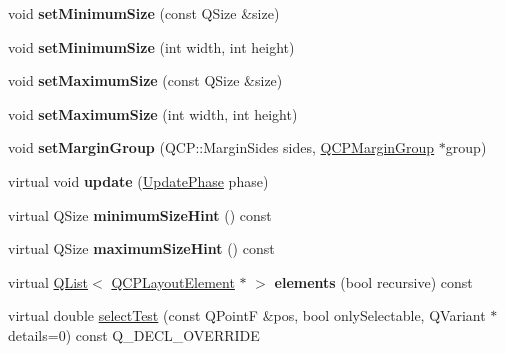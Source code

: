 \begin{DoxyCompactItemize}
\item 
void {\bfseries set\+Minimum\+Size} (const Q\+Size \&size)\hypertarget{class_q_c_p_layout_element_a5dd29a3c8bc88440c97c06b67be7886b}{}\label{class_q_c_p_layout_element_a5dd29a3c8bc88440c97c06b67be7886b}

\item 
void {\bfseries set\+Minimum\+Size} (int width, int height)\hypertarget{class_q_c_p_layout_element_a8e0447614a0bf92de9a7304588c6b96e}{}\label{class_q_c_p_layout_element_a8e0447614a0bf92de9a7304588c6b96e}

\item 
void {\bfseries set\+Maximum\+Size} (const Q\+Size \&size)\hypertarget{class_q_c_p_layout_element_a74eb5280a737ab44833d506db65efd95}{}\label{class_q_c_p_layout_element_a74eb5280a737ab44833d506db65efd95}

\item 
void {\bfseries set\+Maximum\+Size} (int width, int height)\hypertarget{class_q_c_p_layout_element_a03e0e9c48f230217c529b0819f832d84}{}\label{class_q_c_p_layout_element_a03e0e9c48f230217c529b0819f832d84}

\item 
void {\bfseries set\+Margin\+Group} (Q\+C\+P\+::\+Margin\+Sides sides, \hyperlink{class_q_c_p_margin_group}{Q\+C\+P\+Margin\+Group} $\ast$group)\hypertarget{class_q_c_p_layout_element_a516e56f76b6bc100e8e71d329866847d}{}\label{class_q_c_p_layout_element_a516e56f76b6bc100e8e71d329866847d}

\item 
virtual void {\bfseries update} (\hyperlink{class_q_c_p_layout_element_a0d83360e05735735aaf6d7983c56374d}{Update\+Phase} phase)\hypertarget{class_q_c_p_layout_element_ad6884e89825dbe06f198f659120799e6}{}\label{class_q_c_p_layout_element_ad6884e89825dbe06f198f659120799e6}

\item 
virtual Q\+Size {\bfseries minimum\+Size\+Hint} () const \hypertarget{class_q_c_p_layout_element_a011b52633e4bf631b2061dae4aee73dd}{}\label{class_q_c_p_layout_element_a011b52633e4bf631b2061dae4aee73dd}

\item 
virtual Q\+Size {\bfseries maximum\+Size\+Hint} () const \hypertarget{class_q_c_p_layout_element_adb2e949deaf27d9f2c6a6717d29ded2b}{}\label{class_q_c_p_layout_element_adb2e949deaf27d9f2c6a6717d29ded2b}

\item 
virtual \hyperlink{class_q_list}{Q\+List}$<$ \hyperlink{class_q_c_p_layout_element}{Q\+C\+P\+Layout\+Element} $\ast$ $>$ {\bfseries elements} (bool recursive) const \hypertarget{class_q_c_p_layout_element_af9e2f92be3efce79b6a0ceeabd89e030}{}\label{class_q_c_p_layout_element_af9e2f92be3efce79b6a0ceeabd89e030}

\item 
virtual double \hyperlink{class_q_c_p_layout_element_a9e264e2033d3c136707792cd77932783}{select\+Test} (const Q\+PointF \&pos, bool only\+Selectable, Q\+Variant $\ast$details=0) const Q\+\_\+\+D\+E\+C\+L\+\_\+\+O\+V\+E\+R\+R\+I\+DE
\end{DoxyCompactItemize}

